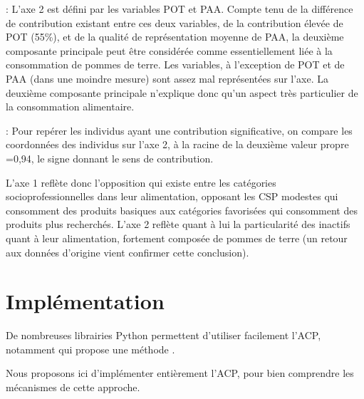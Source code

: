 \documentclass[letterpaper,10pt,french]{sphinxmanual}
\begin{document}
\sphinxhyphen{}  : L’axe 2 est défini par les variables POT et PAA. Compte tenu de la différence de contribution existant entre ces deux variables, de la contribution élevée de POT (55\%), et de la qualité de représentation moyenne de PAA, la deuxième composante principale peut être considérée comme essentiellement liée à la consommation de pommes de terre. Les variables, à l’exception de POT et de PAA (dans une moindre mesure) sont assez mal représentées sur l’axe. La deuxième composante principale n’explique donc qu’un aspect très particulier de la consommation alimentaire.

\sphinxhyphen{}  : Pour repérer les individus ayant une contribution significative, on compare les coordonnées des individus sur l’axe 2, à la racine de la deuxième valeur propre  =0,94, le signe donnant le sens de contribution.

\sphinxAtStartPar
L’axe 1 reflète donc l’opposition qui existe entre les catégories socio\sphinxhyphen{}professionnelles dans leur alimentation, opposant les CSP modestes qui consomment des produits basiques aux catégories favorisées qui consomment des produits plus recherchés. L’axe 2 reflète quant à lui la particularité des inactifs quant à leur alimentation, fortement composée de pommes de terre (un retour aux données d’origine vient confirmer cette conclusion).


\section{Implémentation}
\label{\detokenize{acp:implementation}}
\sphinxAtStartPar
De nombreuses librairies Python permettent d’utiliser facilement l’ACP, notamment  qui propose une méthode .

\sphinxAtStartPar
Nous proposons ici d’implémenter entièrement l’ACP, pour bien comprendre les mécanismes de cette approche.
\end{document}
